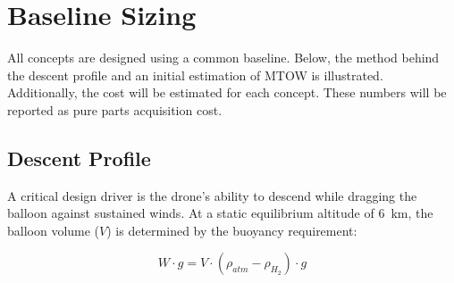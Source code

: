







\section{Baseline Sizing}

All concepts are designed using a common baseline. Below, the method behind the descent profile and an initial estimation of MTOW is illustrated. Additionally, the cost will be estimated for each concept. These numbers will be reported as pure parts acquisition cost.
\subsection*{Descent Profile}

A critical design driver is the drone's ability to descend while dragging the balloon against sustained winds. At a static equilibrium altitude of 6~km, the balloon volume ($V$) is determined by the buoyancy requirement:

\begin{equation}
    W \cdot g = V \cdot (\rho_{atm} - \rho_{H_2}) \cdot g
\end{equation}

